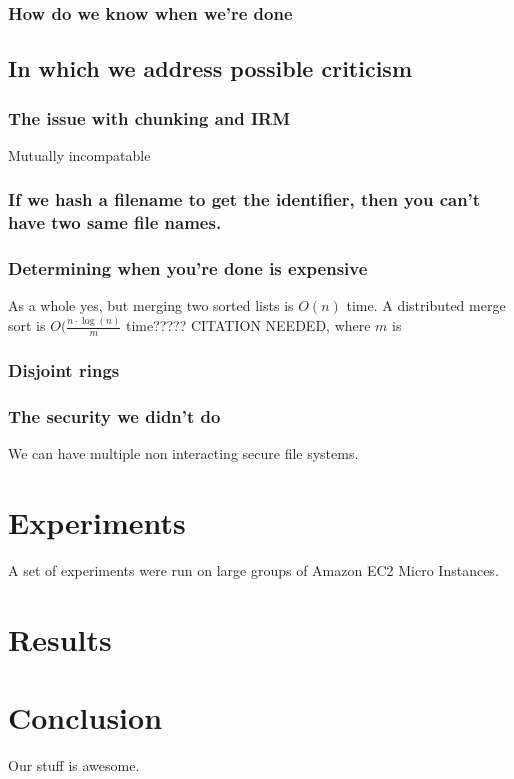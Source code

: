\documentclass[conference, compsocconf, letterpaper]{IEEEtran}
\begin{document}
\subsubsection{How do we know when we're done}


\subsection{In which we address possible criticism}
\subsubsection{The issue with chunking and IRM}
Mutually incompatable

\subsubsection{If we hash a filename to get the identifier, then you can't have two same file names.}
\subsubsection{Determining when you're done is expensive}
As a whole yes, but merging two sorted lists is $O(n)$ time.  A distributed merge sort is $O( \frac{n \cdot \log (n)}{m} $ time????? CITATION NEEDED, where $m$ is 


\subsubsection{Disjoint rings}

\subsubsection{The security we didn't do}
We can have multiple non interacting secure file systems.


\section{Experiments}
A set of experiments were run on large groups of Amazon EC2 Micro Instances\cite{amazon-micro}.
\section{Results}

\section{Conclusion}
Our stuff \cite{code} is awesome.



\end{document}

